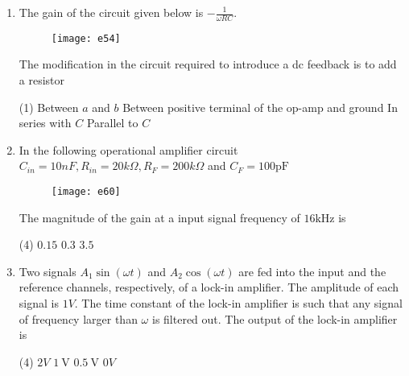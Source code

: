 \begin{enumerate}
	\begin{figure}[H]
		\centering
		\texttt{[image: e50]}
	\end{figure}
	The value of $R_{1}$ required to deliver $10 \mathrm{~mW}$ of power across $R_{L}$ is
	{}
\begin{tasks}(4)
\task[\textbf{A.}] $12 k \Omega$
\task[\textbf{B.}] $4 k \Omega$
\task[\textbf{C.}]  $8 \mathrm{k} \Omega$
\task[\textbf{D.}]  $14 k \Omega$
\end{tasks}                
	\item The gain of the circuit given below is $-\frac{1}{\omega R C}$.\\
	\begin{figure}[H]
		\centering
		\texttt{[image: e54]}
	\end{figure}
	The modification in the circuit required to introduce a dc feedback is to add a resistor
	{}
\begin{tasks}(1)
\task[\textbf{A.}] Between $a$ and $b$
\task[\textbf{B.}]  Between positive terminal of the op-amp and ground
\task[\textbf{C.}] In series with $C$
\task[\textbf{D.}] Parallel to $C$
\end{tasks}
	\item In the following operational amplifier circuit $C_{i n}=10 n F, R_{i n}=20 k \Omega, R_{F}=200 k \Omega$ and $C_{F}=100 \mathrm{pF}$\\
	\begin{figure}[H]
		\centering
		\texttt{[image: e60]}
	\end{figure}
	The magnitude of the gain at a input signal frequency of $16 \mathrm{kHz}$ is
	{}
\begin{tasks}(4)
\task[\textbf{B.}] $0.15$
\task[\textbf{C.}] $0.3$
\task[\textbf{D.}] $3.5$
\end{tasks}
	\item Two signals $A_{1} \sin (\omega t)$ and $A_{2} \cos (\omega t)$ are fed into the input and the reference channels, respectively, of a lock-in amplifier. The amplitude of each signal is $1 V$. The time constant of the lock-in amplifier is such that any signal of frequency larger than $\omega$ is filtered out. The output of the lock-in amplifier is
	{}
\begin{tasks}(4)
\task[\textbf{A.}]  $2 V$
\task[\textbf{B.}] $1 \mathrm{~V}$
\task[\textbf{C.}] $0.5 \mathrm{~V}$
\task[\textbf{D.}] $0 V$

\end{tasks}
\end{enumerate}
